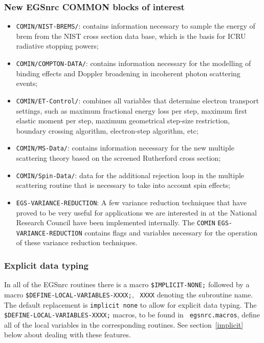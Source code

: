 \subsubsection{New EGSnrc COMMON blocks of interest}

\begin{itemize}
\item
{\tt COMIN/NIST-BREMS/}: contains information necessary 
to sample the energy of brem from the NIST 
cross section data base, which is the basis for ICRU radiative 
stopping powers;
 

\item
{\tt COMIN/COMPTON-DATA/}: contains information necessary 
for the modelling of binding effects and Doppler broadening in 
incoherent photon scattering events;

\item
{\tt COMIN/ET-Control/}: combines all variables that determine 
electron transport settings, such as maximum fractional 
energy loss per step, maximum first elastic moment per step, 
maximum geometrical step-size restriction, boundary crossing 
algorithm, electron-step algorithm, etc;

\item
{\tt COMIN/MS-Data/}: contains information necessary for 
the new multiple scattering theory based on the screened 
Rutherford cross section;

\item
{\tt COMIN/Spin-Data/}: data for the additional rejection 
loop in the multiple scattering routine that is necessary 
to take into account spin effects;

\item
{\tt EGS-VARIANCE-REDUCTION}: A few variance reduction 
techniques that have proved to be very useful for applications 
we are interested in at the National Research Council 
have been implemented internally. The {\tt COMIN} 
{\tt EGS-VARIANCE-REDUCTION} contains flags and 
variables necessary for the operation of these variance 
reduction techniques.
\end{itemize}

\subsubsection{Explicit data typing}

\label{types}
In all of the EGSnrc routines there is a macro {\tt \$IMPLICIT-NONE;}
followed by a macro {\tt \$DEFINE-LOCAL-VARIABLES-XXXX;}, {\tt
XXXX} denoting the subroutine name. The default replacement is
{\tt implicit none} to allow for explicit data typing.  The {\tt
\$DEFINE-LOCAL-VARIABLES-XXXX;} macros, to be found in {\tt
egsnrc.macros}, define all of the local variables in the corresponding
routines. See section~\ref{implicit} below about dealing with these features.
 

